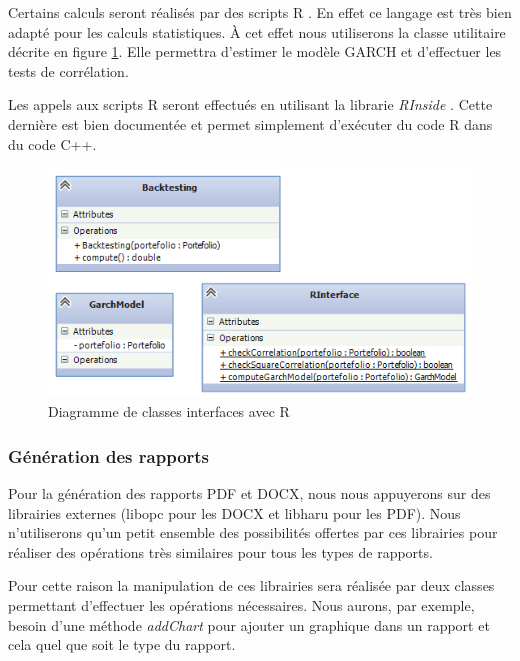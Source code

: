 \documentclass[a4paper,titlepage,french]{report}
\begin{document}
Certains calculs seront réalisés par des scripts R \cite{website:R}.
En effet ce langage est très bien adapté pour les calculs statistiques.
\`A cet effet nous utiliserons la classe utilitaire décrite en figure \ref{fig:diagramme-classes-interface-r}.
Elle permettra d'estimer le modèle GARCH et d'effectuer les tests de corrélation.

Les appels aux scripts R seront effectués en utilisant la librarie \textit{RInside} \cite{website:RInside}. Cette dernière est bien documentée et permet simplement d'exécuter du code R dans du code C++.

\begin{figure}
  	\center
  	\includegraphics[width=1\textwidth]{diagramme-classes-interface-r.png}
  	\caption{Diagramme de classes interfaces avec R}
  	\label{fig:diagramme-classes-interface-r}
\end{figure}


\subsubsection{Génération des rapports}

Pour la génération des rapports PDF et DOCX, nous nous appuyerons sur des librairies externes (libopc \cite{website:libopc} pour les DOCX et libharu \cite{website:libharu} pour les PDF).
Nous n'utiliserons qu'un petit ensemble des possibilités offertes par ces librairies pour réaliser des opérations très similaires pour tous les types de rapports.

Pour cette raison la manipulation de ces librairies sera réalisée par deux classes permettant d'effectuer les opérations nécessaires.
Nous aurons, par exemple, besoin d'une méthode \textit{addChart} pour ajouter un graphique dans un rapport et cela quel que soit le type du rapport.
\end{document}

